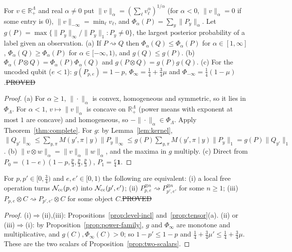 \begin{proposition}\label{prop:power-family}
For $v\in\mathbb R_+^\Lambda$ and real $\alpha\ne0$ put $\|v\|_\alpha=(\sum_\ell v_\ell^\alpha)^{1/\alpha}$ (for $\alpha<0$, $\|v\|_\alpha=0$ if some entry is $0$), $\|v\|_{-\infty}=\min_\ell v_\ell$, and $\Phi_\alpha(P)=\sum_y\|P_y\|_\alpha$. Let $g(P)=\max\{\|P_y\|_\infty/\|P_y\|_1:P_y\ne0\}$, the largest posterior probability of a label given an observation.
(a) If $P\rightsquigarrow Q$ then $\Phi_\alpha(Q)\le\Phi_\alpha(P)$ for $\alpha\in[1,\infty]$, $\Phi_\alpha(Q)\ge\Phi_\alpha(P)$ for $\alpha\in[-\infty,1)$, and $g(Q)\le g(P)$.
(b) $\Phi_\alpha(P\otimes Q)=\Phi_\alpha(P)\Phi_\alpha(Q)$ and $g(P\otimes Q)=g(P)g(Q)$.
(c) For the uncoded qubit ($e<1$): $g(P_{p,e})=1-p$, $\Phi_\infty=\tfrac14+\tfrac34\mu$ and $\Phi_{-\infty}=\tfrac14(1-\mu)$.\hfill\st{PROVED}
\end{proposition}
\begin{proof}
(a) For $\alpha\ge1$, $\|\cdot\|_\alpha$ is convex, homogeneous and symmetric, so it lies in $\Phi_\Lambda$. For $\alpha<1$, $v\mapsto\|v\|_\alpha$ is concave on $\mathbb R_+^\Lambda$ (power means with exponent at most $1$ are concave) and homogeneous, so $-\|\cdot\|_\alpha\in\Phi_\Lambda$. Apply Theorem~\ref{thm:complete}. For $g$: by Lemma~\ref{lem:kernel}, $\|Q_{y'}\|_\infty\le\sum_{y,\pi}M(y',\pi\mid y)\|P_y\|_\infty\le g(P)\sum_{y,\pi}M(y',\pi\mid y)\|P_y\|_1=g(P)\|Q_{y'}\|_1$.
(b) $\|v\otimes w\|_\alpha=\|v\|_\alpha\|w\|_\alpha$, and the maxima in $g$ multiply. (c) Direct from $P_0=(1-e)(1-p,\tfrac p3,\tfrac p3,\tfrac p3)$, $P_1=\tfrac e4\mathbf 1$.
\end{proof}

\begin{theorem}\label{thm:exact-tensor}
For $p,p'\in[0,\tfrac34)$ and $e,e'\in[0,1)$ the following are equivalent: (i) a local free operation turns $\mathcal{N}_{\rm cc}(p,e)$ into $\mathcal{N}_{\rm cc}(p',e')$; (ii) $P_{p,e}^{\otimes n}\rightsquigarrow P_{p',e'}^{\otimes n}$ for some $n\ge1$; (iii) $P_{p,e}\otimes C\rightsquigarrow P_{p',e'}\otimes C$ for some object $C$.\hfill\st{PROVED}
\end{theorem}
\begin{proof}
(i)$\Rightarrow$(ii),(iii): Propositions~\ref{prop:level-incl} and~\ref{prop:tensor}(a). (ii) or (iii)$\Rightarrow$(i): by Proposition~\ref{prop:power-family}, $g$ and $\Phi_\infty$ are monotone and multiplicative, and $g(C),\Phi_\infty(C)>0$; so $1-p'\le1-p$ and $\tfrac14+\tfrac34\mu'\le\tfrac14+\tfrac34\mu$. These are the two scalars of Proposition~\ref{prop:two-scalars}.
\end{proof}


